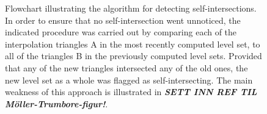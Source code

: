 \begin{figure}[htpb]
    \centering
    \resizebox{0.9\linewidth}{!}{}
    \caption[Flowchart illustrating the algorithm for detecting
    self-intersections]
    {Flowchart illustrating the algorithm for detecting self-intersections.
        In order to ensure that no self-intersection went unnoticed, the
        indicated procedure was carried out by comparing each of the
        interpolation triangles A in the most recently computed level set,
        to all of the triangles B in the previously computed level sets.
        Provided that any of the new triangles intersected any of the old ones,
        the new level set as a whole was flagged as self-intersecting. The
        main weakness of this approach is illustrated in
        \emph{\textbf{SETT INN REF TIL M\"oller-Trumbore-figur!}}.
    }
    \label{fig:intersection_flowchart}
\end{figure}
